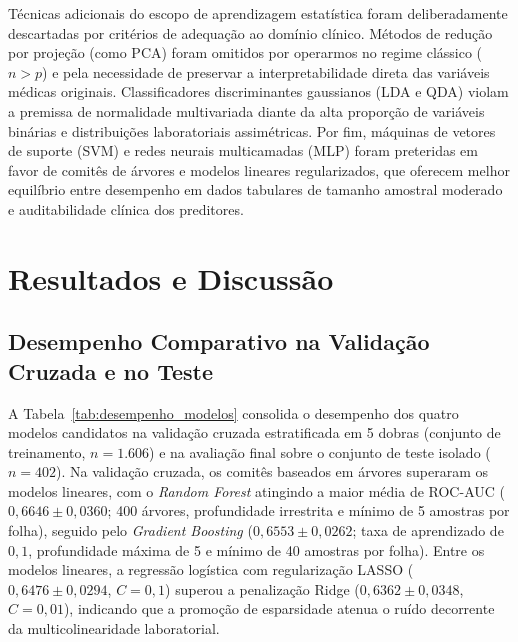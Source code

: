 \documentclass[conference]{IEEEtran}
\begin{document}
Técnicas adicionais do escopo de aprendizagem estatística foram deliberadamente descartadas por critérios de adequação ao domínio clínico. Métodos de redução por projeção (como PCA) foram omitidos por operarmos no regime clássico ($n > p$) e pela necessidade de preservar a interpretabilidade direta das variáveis médicas originais. Classificadores discriminantes gaussianos (LDA e QDA) violam a premissa de normalidade multivariada diante da alta proporção de variáveis binárias e distribuições laboratoriais assimétricas. Por fim, máquinas de vetores de suporte (SVM) e redes neurais multicamadas (MLP) foram preteridas em favor de comitês de árvores e modelos lineares regularizados, que oferecem melhor equilíbrio entre desempenho em dados tabulares de tamanho amostral moderado e auditabilidade clínica dos preditores.

\section{Resultados e Discussão}

\subsection{Desempenho Comparativo na Validação Cruzada e no Teste}
A Tabela~\ref{tab:desempenho_modelos} consolida o desempenho dos quatro modelos candidatos na validação cruzada estratificada em 5 dobras (conjunto de treinamento, $n = 1.606$) e na avaliação final sobre o conjunto de teste isolado ($n = 402$). Na validação cruzada, os comitês baseados em árvores superaram os modelos lineares, com o \textit{Random Forest} atingindo a maior média de ROC-AUC ($0,6646 \pm 0,0360$; 400 árvores, profundidade irrestrita e mínimo de 5 amostras por folha), seguido pelo \textit{Gradient Boosting} ($0,6553 \pm 0,0262$; taxa de aprendizado de $0,1$, profundidade máxima de 5 e mínimo de 40 amostras por folha). Entre os modelos lineares, a regressão logística com regularização LASSO ($0,6476 \pm 0,0294$, $C = 0,1$) superou a penalização Ridge ($0,6362 \pm 0,0348$, $C = 0,01$), indicando que a promoção de esparsidade atenua o ruído decorrente da multicolinearidade laboratorial.
\end{document}
